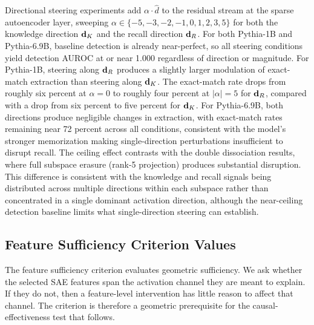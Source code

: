 Directional steering experiments add $\alpha \cdot \hat{d}$ to the residual stream at the sparse autoencoder layer, sweeping $\alpha \in \{-5, -3, -2, -1, 0, 1, 2, 3, 5\}$ for both the knowledge direction $\mathbf{d}_K$ and the recall direction $\mathbf{d}_R$.
For both Pythia-1B and Pythia-6.9B, baseline detection is already near-perfect, so all steering conditions yield detection AUROC at or near 1.000 regardless of direction or magnitude.
For Pythia-1B, steering along $\mathbf{d}_R$ produces a slightly larger modulation of exact-match extraction than steering along $\mathbf{d}_K$. The exact-match rate drops from roughly six percent at $\alpha{=}0$ to roughly four percent at $|\alpha|{=}5$ for $\mathbf{d}_R$, compared with a drop from six percent to five percent for $\mathbf{d}_K$.
For Pythia-6.9B, both directions produce negligible changes in extraction, with exact-match rates remaining near 72 percent across all conditions, consistent with the model's stronger memorization making single-direction perturbations insufficient to disrupt recall.
The ceiling effect contrasts with the double dissociation results, where full subspace erasure (rank-5 projection) produces substantial disruption.
This difference is consistent with the knowledge and recall signals being distributed across multiple directions within each subspace rather than concentrated in a single dominant activation direction, although the near-ceiling detection baseline limits what single-direction steering can establish.

\FloatBarrier

\subsection{Feature Sufficiency Criterion Values}
\label{app:fsc}

The feature sufficiency criterion evaluates geometric sufficiency. We ask whether the selected SAE features span the activation channel they are meant to explain. If they do not, then a feature-level intervention has little reason to affect that channel. The criterion is therefore a geometric prerequisite for the causal-effectiveness test that follows.

